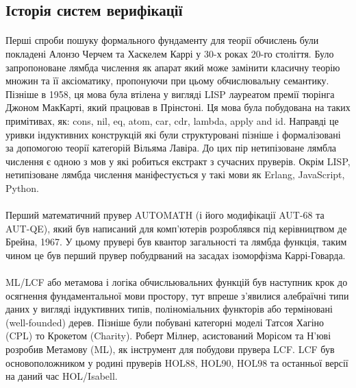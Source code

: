 \documentclass[11pt,oneside]{article}
\begin{document}
\newpage
\subsection{Історія систем верифікації}

    \paragraph{}
    Перші спроби пошуку формального фундаменту для теорії обчислень були покладені
    Алонзо Черчем та Хаскелем Каррі у 30-х роках 20-го століття. Було запропоноване
    лямбда числення як апарат який може замінити класичну теорію множин та її аксіоматику,
    пропонуючи при цьому обчислювальну семантику. Пізніше в 1958, ця мова була втілена
    у вигляді LISP лауреатом премії тюрінга Джоном МакКарті, який працював в Прінстоні.
    Ця мова була побудована на таких примітивах, як: cons, nil, eq, atom, car, cdr,
    lambda, apply and id. Направді це уривки індуктивних конструкцій які були
    структуровані пізніше і формалізовані за допомогою теорії категорій Вільяма Лавіра.
    До цих пір нетипізоване лямбла числення є одною з мов у які робиться екстракт
    з сучасних пруверів. Окрім LISP, нетипізоване лямбда числення маніфестується у такі
    мови як Erlang, JavaScript, Python.

    \paragraph{}
    Перший математичний прувер AUTOMATH (і його модифікації AUT-68 та AUT-QE),
    який був написаний для комп'ютерів розроблявся під керівництвом де Брейна, 1967.
    У цьому прувері був квантор загальності та лямбда функція, таким чином це був перший прувер
    побудрваний на засадах ізоморфізма Каррі-Говарда.

    \paragraph{}
    ML/LCF або метамова і логіка обчисльювальних функцій був наступник крок до
    осягнення фундаментальної мови простору, тут впреше з'явилися алебраїчні типи даних
    у вигляді індуктивних типів, поліноміальних функторів або терміновані (well-founded) дерев.
    Пізніше були побувані категорні моделі Татсоя Хагіно (CPL) то Крокетом (Charity).
    Роберт Мілнер, асистований Морісом та Н'юві розробив Метамову (ML), як
    інструмент для побудови прувера LCF. LCF був основоположником у родині пруверів
    HOL88, HOL90, HOL98 та останньої версії на даний час HOL/Isabell.
\end{document}
